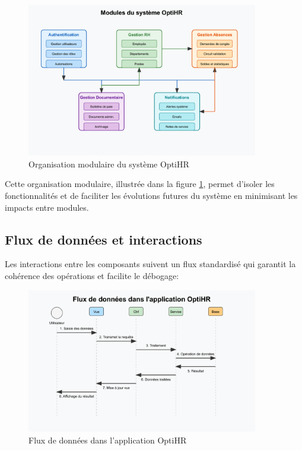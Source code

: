 \begin{figure}[H]
    \centering
    \includegraphics[width=0.9\textwidth]{images/diagrammes/architecture/modules-systeme.pdf}
    \caption{Organisation modulaire du système OptiHR}
    \label{fig:modules_systeme}
\end{figure}

Cette organisation modulaire, illustrée dans la figure \ref{fig:modules_systeme}, permet d'isoler les fonctionnalités 
et de faciliter les évolutions futures du système en minimisant les impacts entre modules.

\subsection{Flux de données et interactions}
Les interactions entre les composants suivent un flux standardisé qui garantit la cohérence des opérations
et facilite le débogage:

\begin{figure}[H]
    \centering
    \includegraphics[width=0.9\textwidth]{images/diagrammes/architecture/flux-donnees.pdf}
    \caption{Flux de données dans l'application OptiHR}
    \label{fig:flux_donnees}
\end{figure}

